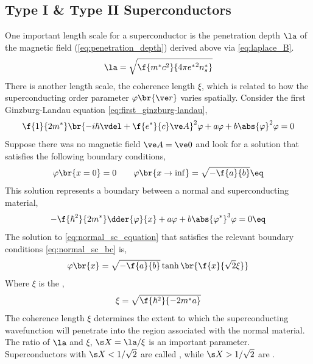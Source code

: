 \documentclass{article}
\newcommand{\vp}{\varphi}
\begin{document}
\subsection{Type I \& Type II Superconductors}
One important length scale for a superconductor is the penetration depth $\la$ of the magnetic field (\cref{eq:penetration_depth}) derived above via \cref{eq:laplace_B}.
\[ \la = \sqrt{\f{m^* c^2}{4 \pi {e^*}^2 n_s^*}} \]
There is another length scale, the coherence length $\xi$, which is related to how the superconducting order parameter $\vp\br{\ve r}$ varies spatially. Consider the first Ginzburg-Landau equation \cref{eq:first_ginzburg-landau},
\[ \f{1}{2m^{*}}\br{-i\hbar \vdel + \f{e^*}{c} \ve A}^2 \vp + a \vp + b \abs{\vp}^2\vp = 0 \]
Suppose there was no magnetic field $\ve A = \ve 0$ and look for a solution that satisfies the following boundary conditions,
\[ \vp\br{x = 0} = 0 \qquad \vp\br{x \to \inf} = \sqrt{-\f{a}{b}} \eq \label{eq:normal_sc_bc}\]
This solution represents a boundary between a normal and superconducting material,
\[ - \f{\hbar^2}{2m^*}\dder{\vp}{x} + a \vp + b \abs{\vp^*}^3 \vp = 0 \eq \label{eq:normal_sc_equation}\]
The solution to \cref{eq:normal_sc_equation} that satisfies the relevant boundary conditions \cref{eq:normal_sc_bc} is,
\[ \varphi\br{x} = \sqrt{-\f{a}{b}} \tanh\br{\f{x}{\sqrt{2}\xi}} \]
Where $\xi$ is the ,
\[ \xi = \sqrt{\f{\hbar^2}{-2 m^* a}} \]
The coherence length $\xi$ determines the extent to which the superconducting wavefunction will penetrate into the region associated with the normal material. The ratio of $\la$ and $\xi$, $\s X = \la / \xi$ is an important parameter. Superconductors with $\s X < 1/\sqrt{2}$ are called , while $\s X>1/\sqrt{2}$ are . \\
\end{document}
